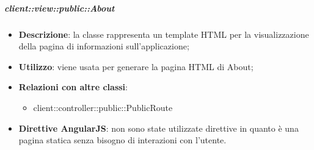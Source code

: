 		\subparagraph{client::view::public::About} %
		\label{subp:bdsm_app_client_view_public_about}
			\begin{itemize}
				\item \textbf{Descrizione}: la classe rappresenta un template HTML per la visualizzazione della pagina di informazioni sull'applicazione;
				\item \textbf{Utilizzo}: viene usata per generare la pagina HTML di About;
				\item \textbf{Relazioni con altre classi}:
					\begin{itemize}
						\item client::controller::public::PublicRoute
					\end{itemize}
				\item \textbf{Direttive AngularJS}: non sono state utilizzate direttive in quanto è una pagina statica senza bisogno di interazioni con l'utente.
			\end{itemize}

